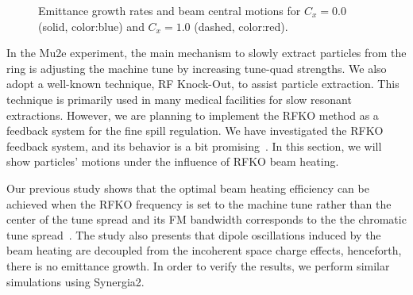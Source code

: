 \documentclass[aps,prstab,onecolumn,preprint]{revtex4-1}
\begin{document}
\begin{figure}[!tbp]
  \caption{\label{fig:rfko1}Emittance growth rates and beam central motions for $C_{x} = 0.0$ (solid, color:blue) and $C_{x} = 1.0$ (dashed, color:red).}
\end{figure}

In the Mu2e experiment, the main mechanism to slowly extract particles from the ring is adjusting the machine tune by increasing tune-quad strengths. We also adopt a well-known technique, RF Knock-Out, to assist particle extraction. This technique is primarily used in many medical facilities for slow resonant extractions. However, we are planning to implement the RFKO method as a feedback system for the fine spill regulation. We have investigated the RFKO feedback system, and its behavior is a bit promising~\cite{mu2e}. In this section, we will show particles' motions under the influence of RFKO beam heating. 

Our previous study shows that the optimal beam heating efficiency can be achieved when the RFKO frequency is set to the machine tune rather than the center of the tune spread and its FM bandwidth corresponds to the the chromatic tune spread~\cite{ipac11}. The study also presents that dipole oscillations induced by the beam heating are decoupled from the incoherent space charge effects, henceforth, there is no emittance growth. In order to verify the results, we perform similar simulations using Synergia2.
\end{document}
